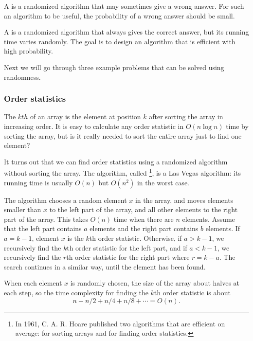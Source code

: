 
A  is a randomized algorithm
that may sometimes give a wrong answer.
For such an algorithm to be useful,
the probability of a wrong answer should be small.


A  is a randomized algorithm
that always gives the correct answer,
but its running time varies randomly.
The goal is to design an algorithm that is
efficient with high probability.

Next we will go through three example problems that
can be solved using randomness.

\subsubsection{Order statistics}


The $kth$  of an array
is the element at position $k$ after sorting
the array in increasing order.
It is easy to calculate any order statistic
in $O(n \log n)$ time by sorting the array,
but is it really needed to sort the entire array
just to find one element?

It turns out that we can find order statistics
using a randomized algorithm without sorting the array.
The algorithm, called \footnote{In 1961,
C. A. R. Hoare published two algorithms that
are efficient on average:  
 \cite{hoa61a} for sorting arrays and
 \cite{hoa61b} for finding order statistics.}, is a Las Vegas algorithm:
its running time is usually $O(n)$
but $O(n^2)$ in the worst case.

The algorithm chooses a random element $x$
in the array, and moves elements smaller than $x$
to the left part of the array,
and all other elements to the right part of the array.
This takes $O(n)$ time when there are $n$ elements.
Assume that the left part contains $a$ elements
and the right part contains $b$ elements.
If $a=k-1$, element $x$ is the $k$th order statistic.
Otherwise, if $a>k-1$, we recursively find the $k$th order
statistic for the left part,
and if $a<k-1$, we recursively find the $r$th order
statistic for the right part where $r=k-a$.
The search continues in a similar way, until the element
has been found.

When each element $x$ is randomly chosen,
the size of the array about halves at each step,
so the time complexity for
finding the $k$th order statistic is about
\[n+n/2+n/4+n/8+\cdots=O(n).\]

